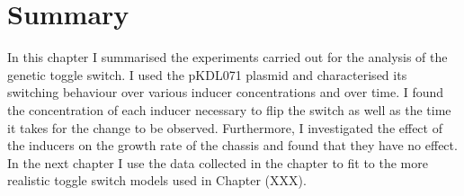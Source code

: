 \section{Summary}


In this chapter I summarised the experiments carried out for the analysis of the genetic toggle switch. I used the pKDL071 plasmid and characterised its switching behaviour over various inducer concentrations and over time. I found the concentration of each inducer necessary to flip the switch as well as the time it takes for the change to be observed. Furthermore, I investigated the effect of the inducers on the growth rate of the chassis and found that they have no effect. In the next chapter I use the data collected in the chapter to fit to the more realistic toggle switch models used in Chapter (XXX). 





 
 